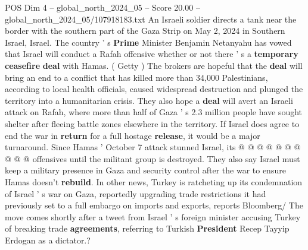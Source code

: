 \begin{textsample}{POS Dim 4 – global\_north\_2024\_05 – Score 20.00 – global\_north\_2024\_05/107918183.txt}
An Israeli soldier directs a tank near the border with the southern part of the Gaza Strip on May 2, 2024 in Southern Israel, Israel.
The country ' s \textbf{Prime} Minister Benjamin Netanyahu has vowed that Israel will conduct a Rafah offensive whether or not there ' s a \textbf{temporary} \textbf{ceasefire} \textbf{deal} with Hamas. ( Getty ) The brokers are hopeful that the \textbf{deal} will bring an end to a conflict that has killed more than 34,000 Palestinians, according to local health officials, caused widespread destruction and plunged the territory into a humanitarian crisis.
They also hope a \textbf{deal} will avert an Israeli attack on Rafah, where more than half of Gaza ' s 2.3 million people have sought shelter after fleeing battle zones elsewhere in the territory.
If Israel does agree to end the war in \textbf{return} for a full hostage \textbf{release}, it would be a major turnaround.
Since Hamas ' October 7 attack stunned Israel, its @ @ @ @ @ @ @ @ @ @ offensives until the militant group is destroyed.
They also say Israel must keep a military presence in Gaza and security control after the war to ensure Hamas doesn't \textbf{rebuild}.
In other news, Turkey is ratcheting up its condemnation of Israel ' s war on Gaza, reportedly upgrading trade restrictions it had previously set to a full embargo on imports and exports, reports Bloomberg/ The move comes shortly after a tweet from Israel ' s foreign minister accusing Turkey of breaking trade \textbf{agreements}, referring to Turkish \textbf{President} Recep Tayyip Erdogan as a dictator.?

\end{textsample}
